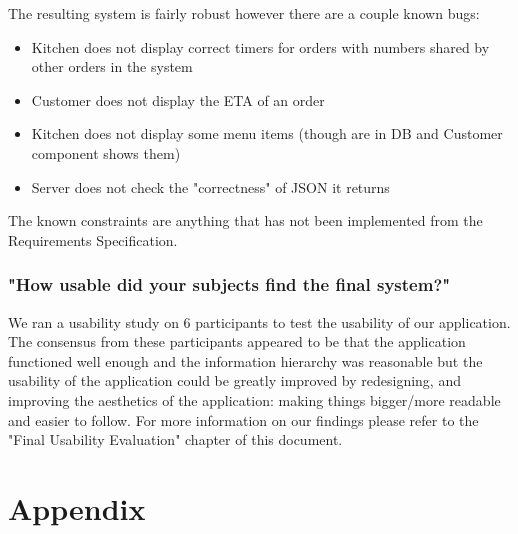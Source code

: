 \documentclass[11pt, oneside, a4paper]{report}   %
\begin{document}
The resulting system is fairly robust however there are a couple known bugs: \\
\begin{itemize}
  \item Kitchen does not display correct timers for orders with numbers shared by other orders in the system
  \item Customer does not display the ETA of an order
  \item Kitchen does not display some menu items (though are in DB and Customer component shows them)
  \item Server does not check the "correctness" of JSON it returns 
\end{itemize}
The known constraints are anything that has not been implemented from the Requirements Specification.

\subsection{"How usable did your subjects find the final system?"}
We ran a usability study on 6 participants to test the usability of our application. The consensus from these participants appeared to be that the application functioned well enough and the information hierarchy was reasonable but the usability of the application could be greatly improved by redesigning, and improving the aesthetics of the application: making things bigger/more readable and easier to follow. For more information on our findings please refer to the "Final Usability Evaluation" chapter of this document.
\chapter{Appendix}

\end{document}
